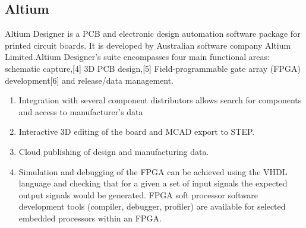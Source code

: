 \documentclass[12pt,a4paper]{report}
\begin{document}
\subsection{Altium}
 \hspace*{1cm}  Altium Designer is a PCB and electronic design automation software package for printed circuit boards. It is developed by Australian software company Altium Limited.Altium Designer's suite encompasses four main functional areas: schematic capture,[4] 3D PCB design,[5] Field-programmable gate array (FPGA) development[6] and release/data management.
\begin{enumerate}
\item    Integration with several component distributors allows search for components and access to manufacturer's data
\item Interactive 3D editing of the board and MCAD export to STEP.
\item Cloud publishing of design and manufacturing data.
\item Simulation and debugging of the FPGA can be achieved using the VHDL language and checking that for a given a set of input signals the expected output signals would be generated. FPGA soft processor software development tools (compiler, debugger, profiler) are available for selected embedded processors within an FPGA.

\end{enumerate}
\end{document}
